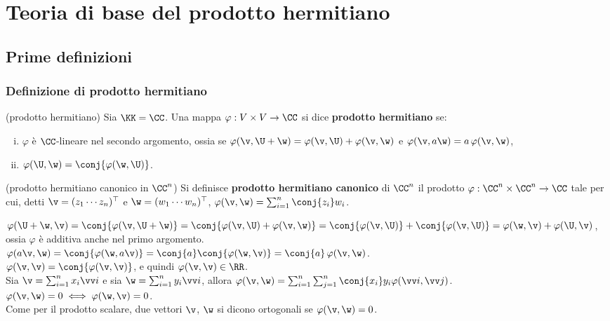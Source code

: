 \chapter{Teoria di base del prodotto hermitiano}

\section{Prime definizioni}

\subsection{Definizione di prodotto hermitiano}

\begin{definition} (prodotto hermitiano) Sia $\KK = \CC$. Una mappa $\varphi : V \times V \to \CC$ si dice \textbf{prodotto hermitiano} se:
	
	\begin{enumerate}[(i)]
		\item $\varphi$ è $\CC$-lineare nel secondo argomento, ossia se $\varphi(\v, \U + \w) = \varphi(\v, \U) + \varphi(\v, \w)$ e
		$\varphi(\v, a \w) = a \, \varphi(\v, \w)$,
		\item $\varphi(\U, \w) = \conj{\varphi(\w, \U)}$.
	\end{enumerate}
\end{definition}

\begin{definition} (prodotto hermitiano canonico in $\CC^n$) Si definisce
	\textbf{prodotto hermitiano canonico} di $\CC^n$ il prodotto $\varphi : \CC^n \times \CC^n \to \CC$ tale per cui, detti $\v = (z_1 \cdots z_n)^\top$ e $\w = (w_1 \cdots w_n)^\top$, $\varphi(\v, \w) = \sum_{i=1}^n \conj{z_i} w_i$.
\end{definition}

\begin{remark}\nl
	\li $\varphi(\U + \w, \v) = \conj{\varphi(\v, \U + \w)} =
	\conj{\varphi(\v, \U) + \varphi(\v, \w)} = \conj{\varphi(\v, \U)} + \conj{\varphi(\v, \U)} = \varphi(\w, \v) + \varphi(\U, \v)$, ossia
	$\varphi$ è additiva anche nel primo argomento. \\
	\li $\varphi(a \v, \w) = \conj{\varphi(\w, a \v)} = \conj{a} \conj{\varphi(\w, \v)} = \conj{a} \, \varphi(\v, \w)$. \\
	\li $\varphi(\v, \v) = \conj{\varphi(\v, \v)}$, e quindi $\varphi(\v, \v) \in \RR$. \\
	\li Sia $\v = \sum_{i=1}^n x_i \vv i$ e sia $\w = \sum_{i=1}^n y_i \vv i$, allora $\varphi(\v, \w) = \sum_{i =1}^n \sum_{j=1}^n \conj{x_i} y_i \varphi(\vv i, \vv j)$. \\
	\li $\varphi(\v, \w) = 0 \iff \varphi(\w, \v) = 0$. \\
	\li Come per il prodotto scalare, due vettori $\v$, $\w$ si dicono ortogonali
	se $\varphi(\v, \w) = 0$.
\end{remark}

